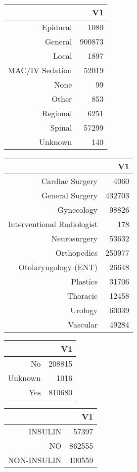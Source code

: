 \bigskip\bigskip
\centering
\begin{tabular}{rr}
  \hline
 & V1 \\ 
  \hline
Epidural & 1080 \\ 
  General & 900873 \\ 
  Local & 1897 \\ 
  MAC/IV Sedation & 52019 \\ 
  None &  99 \\ 
  Other & 853 \\ 
  Regional & 6251 \\ 
  Spinal & 57299 \\ 
  Unknown & 140 \\ 
   \hline
\end{tabular}

\bigskip\bigskip
\centering
\begin{tabular}{rr}
  \hline
 & V1 \\ 
  \hline
Cardiac Surgery & 4060 \\ 
  General Surgery & 432703 \\ 
  Gynecology & 98826 \\ 
  Interventional Radiologist & 178 \\ 
  Neurosurgery & 53632 \\ 
  Orthopedics & 250977 \\ 
  Otolaryngology (ENT) & 26648 \\ 
  Plastics & 31706 \\ 
  Thoracic & 12458 \\ 
  Urology & 60039 \\ 
  Vascular & 49284 \\ 
   \hline
\end{tabular}

\bigskip\bigskip
\centering
\begin{tabular}{rr}
  \hline
 & V1 \\ 
  \hline
No & 208815 \\ 
  Unknown & 1016 \\ 
  Yes & 810680 \\ 
   \hline
\end{tabular}

\bigskip\bigskip
\centering
\begin{tabular}{rr}
  \hline
 & V1 \\ 
  \hline
INSULIN & 57397 \\ 
  NO & 862555 \\ 
  NON-INSULIN & 100559 \\ 
   \hline
\end{tabular}

